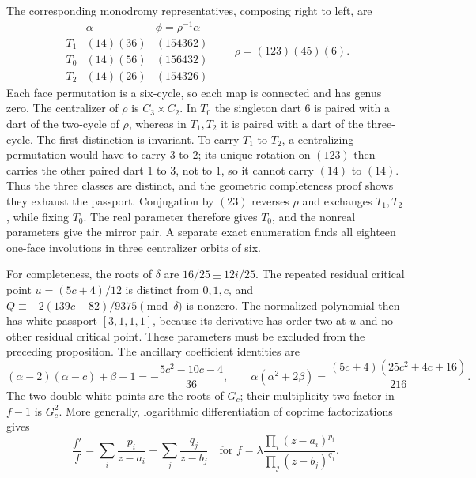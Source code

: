 The corresponding monodromy representatives, composing right to left,
are
\[
\begin{array}{c|c|c}
 &\alpha&\phi=\rho^{-1}\alpha\\\hline
 T_1&(14)(36)&(154362)\\
 T_0&(14)(56)&(156432)\\
 T_2&(14)(26)&(154326)
\end{array}
\qquad\rho=(123)(45)(6).
\]
Each face permutation is a six-cycle, so each map is connected and
has genus zero. The centralizer of $\rho$ is $C_3\times C_2$.
In $T_0$ the singleton dart $6$ is paired with a dart of the two-cycle
of $\rho$, whereas in $T_1,T_2$ it is paired with a dart of the
three-cycle. The first distinction is invariant. To carry $T_1$ to
$T_2$, a centralizing permutation would have to carry $3$ to $2$;
its unique rotation on $(123)$ then carries the other paired dart
$1$ to $3$, not to $1$, so it cannot carry $(14)$ to $(14)$.
Thus the three classes are distinct, and the geometric completeness
proof shows they exhaust the passport. Conjugation by $(23)$ reverses
$\rho$ and exchanges $T_1,T_2$, while fixing $T_0$.
The real parameter therefore gives $T_0$, and the nonreal parameters
give the mirror pair. A separate exact enumeration finds all eighteen
one-face involutions in three centralizer orbits of six.

For completeness, the roots of $\delta$ are
$16/25\pm12i/25$. The repeated residual critical point
$u=(5c+4)/12$ is distinct from $0,1,c$, and
$Q\equiv-2(139c-82)/9375\pmod\delta$ is nonzero.
The normalized polynomial then has white passport $[3,1,1,1]$,
because its derivative has order two at $u$ and no other residual
critical point. These parameters must be excluded from the preceding
proposition. The ancillary coefficient identities are
\[
 (\alpha-2)(\alpha-c)+\beta+1
 =-\frac{5c^2-10c-4}{36},\qquad
 \alpha(\alpha^2+2\beta)
 =\frac{(5c+4)(25c^2+4c+16)}{216}.
\]
The two double white points are the roots of $G_c$; their multiplicity-two factor in $f-1$ is $G_c^2$.
More generally, logarithmic differentiation of coprime factorizations
gives
\[
 \frac{f'}f=\sum_i\frac{p_i}{z-a_i}-\sum_j\frac{q_j}{z-b_j}
 \quad\text{for }f=\lambda
 \frac{\prod_i(z-a_i)^{p_i}}{\prod_j(z-b_j)^{q_j}}.
\]
